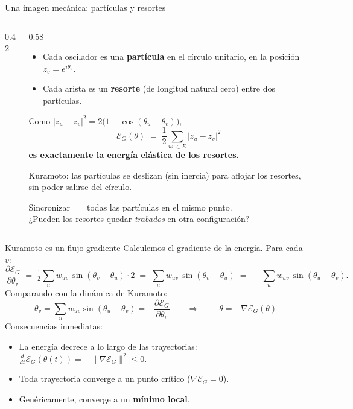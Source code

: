 \documentclass[10pt,aspectratio=169]{beamer}
\newcommand{\E}{\mathcal{E}}
\begin{document}
\begin{frame}{Una imagen mecánica: partículas y resortes}
\begin{columns}
\begin{column}{0.42\textwidth}
\centering
{}
\end{column}
\begin{column}{0.58\textwidth}
\small
\begin{itemize}
    \item Cada oscilador es una \textbf{partícula} en el círculo unitario, en la posición $z_v = e^{i\theta_v}$.
    \item Cada arista es un \textbf{resorte} (de longitud natural cero) entre dos partículas.
\end{itemize}
\pause
Como $|z_u - z_v|^2 = 2\bigl(1-\cos(\theta_u-\theta_v)\bigr)$,
\[
\E_G(\theta) \;=\; \frac12\sum_{uv\in E} |z_u - z_v|^2
\]
\textbf{es exactamente la energía elástica de los resortes.}
\pause
\medskip

Kuramoto: las partículas se deslizan (sin inercia) para aflojar los resortes, sin poder salirse del círculo.
\medskip

Sincronizar $=$ todas las partículas en el mismo punto.\\
¿Pueden los resortes quedar \emph{trabados} en otra configuración?
\end{column}
\end{columns}
\end{frame}

\begin{frame}{Kuramoto es un flujo gradiente}
Calculemos el gradiente de la energía. Para cada $v$:
\[
\frac{\partial \E_G}{\partial \theta_v}
\;=\; \tfrac{1}{2}\sum_{u} w_{uv}\,\sin(\theta_v-\theta_u)\cdot 2
\;=\; \sum_{u} w_{uv}\,\sin(\theta_v-\theta_u)
\;=\; -\sum_{u} w_{uv}\,\sin(\theta_u-\theta_v).
\]
\pause
Comparando con la dinámica de Kuramoto:
\[
\dot\theta_v = \sum_u w_{uv} \sin(\theta_u - \theta_v) = -\frac{\partial \E_G}{\partial \theta_v}
\qquad\Longrightarrow\qquad
\boxed{\;\dot\theta = -\nabla \E_G(\theta)\;}
\]
\pause
\medskip
Consecuencias inmediatas:
\begin{itemize}
    \item La energía decrece a lo largo de las trayectorias: $\frac{d}{dt}\E_G(\theta(t)) = -\|\nabla\E_G\|^2 \le 0$.
    \item Toda trayectoria converge a un punto crítico ($\nabla \E_G = 0$).
    \item Genéricamente, converge a un \textbf{mínimo local}.
\end{itemize}
\end{frame}
\end{document}
